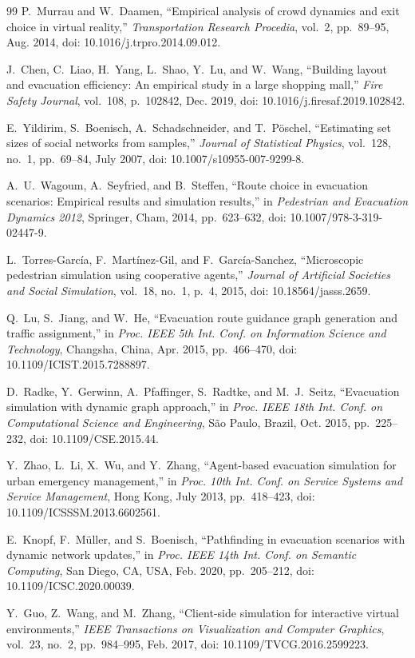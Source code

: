 \documentclass[12pt,a4paper,oneside]{report}
\begin{document}
\begin{thebibliography}{99}
P.~Murrau and W.~Daamen, ``Empirical analysis of crowd dynamics and exit choice in virtual reality,'' \emph{Transportation Research Procedia}, vol.~2, pp.~89--95, Aug. 2014, doi: 10.1016/j.trpro.2014.09.012.

J.~Chen, C.~Liao, H.~Yang, L.~Shao, Y.~Lu, and W.~Wang, ``Building layout and evacuation efficiency: An empirical study in a large shopping mall,'' \emph{Fire Safety Journal}, vol.~108, p.~102842, Dec. 2019, doi: 10.1016/j.firesaf.2019.102842.

E.~Yildirim, S.~Boenisch, A.~Schadschneider, and T.~Pöschel, ``Estimating set sizes of social networks from samples,'' \emph{Journal of Statistical Physics}, vol.~128, no.~1, pp.~69--84, July 2007, doi: 10.1007/s10955-007-9299-8.

A.~U.~Wagoum, A.~Seyfried, and B.~Steffen, ``Route choice in evacuation scenarios: Empirical results and simulation results,'' in \emph{Pedestrian and Evacuation Dynamics 2012}, Springer, Cham, 2014, pp.~623--632, doi: 10.1007/978-3-319-02447-9.

L.~Torres-García, F.~Martínez-Gil, and F.~García-Sanchez, ``Microscopic pedestrian simulation using cooperative agents,'' \emph{Journal of Artificial Societies and Social Simulation}, vol.~18, no.~1, p.~4, 2015, doi: 10.18564/jasss.2659.

Q.~Lu, S.~Jiang, and W.~He, ``Evacuation route guidance graph generation and traffic assignment,'' in \emph{Proc. IEEE 5th Int. Conf. on Information Science and Technology}, Changsha, China, Apr. 2015, pp.~466--470, doi: 10.1109/ICIST.2015.7288897.

D.~Radke, Y.~Gerwinn, A.~Pfaffinger, S.~Radtke, and M.~J.~Seitz, ``Evacuation simulation with dynamic graph approach,'' in \emph{Proc. IEEE 18th Int. Conf. on Computational Science and Engineering}, São Paulo, Brazil, Oct. 2015, pp.~225--232, doi: 10.1109/CSE.2015.44.

Y.~Zhao, L.~Li, X.~Wu, and Y.~Zhang, ``Agent-based evacuation simulation for urban emergency management,'' in \emph{Proc. 10th Int. Conf. on Service Systems and Service Management}, Hong Kong, July 2013, pp.~418--423, doi: 10.1109/ICSSSM.2013.6602561.

E.~Knopf, F.~Müller, and S.~Boenisch, ``Pathfinding in evacuation scenarios with dynamic network updates,'' in \emph{Proc. IEEE 14th Int. Conf. on Semantic Computing}, San Diego, CA, USA, Feb. 2020, pp.~205--212, doi: 10.1109/ICSC.2020.00039.

Y.~Guo, Z.~Wang, and M.~Zhang, ``Client-side simulation for interactive virtual environments,'' \emph{IEEE Transactions on Visualization and Computer Graphics}, vol.~23, no.~2, pp.~984--995, Feb. 2017, doi: 10.1109/TVCG.2016.2599223.

\end{thebibliography}
\end{document}
